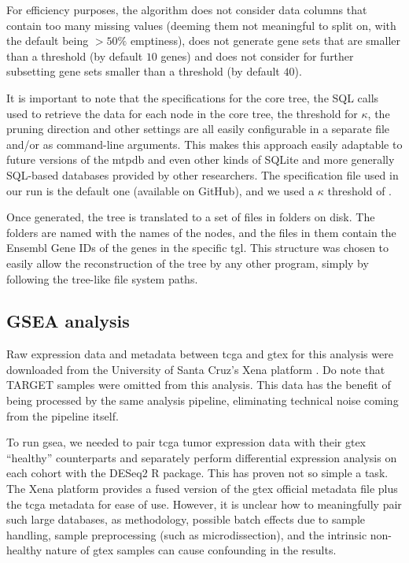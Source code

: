 For efficiency purposes, the algorithm does not consider data columns that
contain too many missing values (deeming them not meaningful to split on, with
the default being $> 50\%$ emptiness), does not generate gene sets that are
smaller than a threshold (by default $10$ genes) and does not consider for
further subsetting gene sets smaller than a threshold (by default $40$).

It is important to note that the specifications for the core tree, the SQL
calls used to retrieve the data for each node in the core tree, the threshold
for $\kappa$, the pruning direction and other settings are all easily
configurable in a separate file and/or as command-line arguments. This makes
this approach easily adaptable to future versions of the \gls{mtpdb} and even
other kinds of SQLite and more generally SQL-based databases provided by other
researchers. The specification file used in our run is the default one
(available on GitHub), and we used a $\kappa$ threshold of .

Once generated, the tree is translated to a set of files in folders on disk. The
folders are named with the names of the nodes, and the  files in
them contain the Ensembl Gene IDs of the genes in the specific \gls{tgl}. This
structure was chosen to easily allow the reconstruction of the tree by any other
program, simply by following the tree-like file system paths.



\subsection{GSEA analysis}

Raw expression data and metadata between \gls{tcga} and \gls{gtex} for this
analysis were downloaded from the University of Santa Cruz's Xena platform
\cite{UCSCXena}. Do note that TARGET samples were omitted from this analysis.
This data has the benefit of being processed by the same analysis pipeline,
eliminating technical noise coming from the pipeline itself.

To run \gls{gsea}, we needed to pair \gls{tcga} tumor expression data with their
\gls{gtex} ``healthy'' counterparts and separately perform differential expression
analysis on each cohort with the DESeq2 R package. This has proven not so simple
a task. The Xena platform provides a fused version of the \gls{gtex} official
metadata file plus the \gls{tcga} metadata for ease of use. However, it is
unclear how to meaningfully pair such large databases, as methodology, possible
batch effects due to sample handling, sample preprocessing (such as
microdissection), and the intrinsic non-healthy nature of \gls{gtex} samples can
cause confounding in the results.

